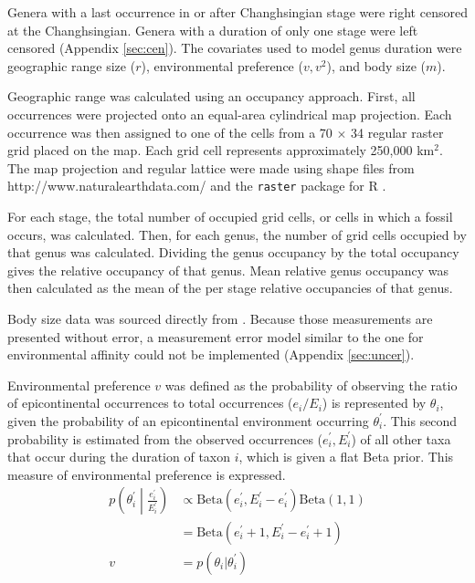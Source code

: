 \documentclass[12pt,letterpaper]{article}
\begin{document}
Genera with a last occurrence in or after Changhsingian stage were right censored at the Changhsingian. Genera with a duration of only one stage were left censored (Appendix \ref{sec:cen}). The covariates used to model genus duration were geographic range size (\(r\)), environmental preference (\(v, v^{2}\)), and body size (\(m\)). 

Geographic range was calculated using an occupancy approach. First, all occurrences were projected onto an equal-area cylindrical map projection. Each occurrence was then assigned to one of the cells from a 70 \(\times\) 34 regular raster grid placed on the map. Each grid cell represents approximately 250,000 km\(^{2}\). The map projection and regular lattice were made using shape files from http://www.naturalearthdata.com/ and the \texttt{raster} package for R \citep{raster}.

For each stage, the total number of occupied grid cells, or cells in which a fossil occurs, was calculated. Then, for each genus, the number of grid cells occupied by that genus was calculated. Dividing the genus occupancy by the total occupancy gives the relative occupancy of that genus. Mean relative genus occupancy was then calculated as the mean of the per stage relative occupancies of that genus. 

Body size data was sourced directly from \citet{Payne2014}. Because those measurements are presented without error, a measurement error model similar to the one for environmental affinity could not be implemented (Appendix \ref{sec:uncer}).

Environmental preference \(v\) was defined as the probability of observing the ratio of epicontinental occurrences to total occurrences (\(e_{i} / E_{i}\)) is represented by \(\theta_{i}\), given the probability of an epicontinental environment occurring \(\theta^{\prime}_{i}\). This second probability is estimated from the observed occurrences (\(e^{\prime}_{i}, E^{\prime}_{i}\)) of all other taxa that occur during the duration of taxon \(i\), which is given a flat Beta prior. This measure of environmental preference is expressed.
\begin{equation}
  \begin{aligned}
    p\left(\theta^{\prime}_{i} \middle| \frac{e^{\prime}_{i}}{E^{\prime}_{i}}\right) &\propto \mathrm{Beta}(e^{\prime}_{i}, E^{\prime}_{i} - e^{\prime}_{i}) \mathrm{Beta}(1, 1) \\
    &= \mathrm{Beta}(e^{\prime}_{i} + 1, E^{\prime}_{i} - e^{\prime}_{i} + 1) \\
    v &= p(\theta_{i} | \theta^{\prime}_{i}) \\
  \end{aligned}
  \label{eq:envpref}
\end{equation}
\end{document}
